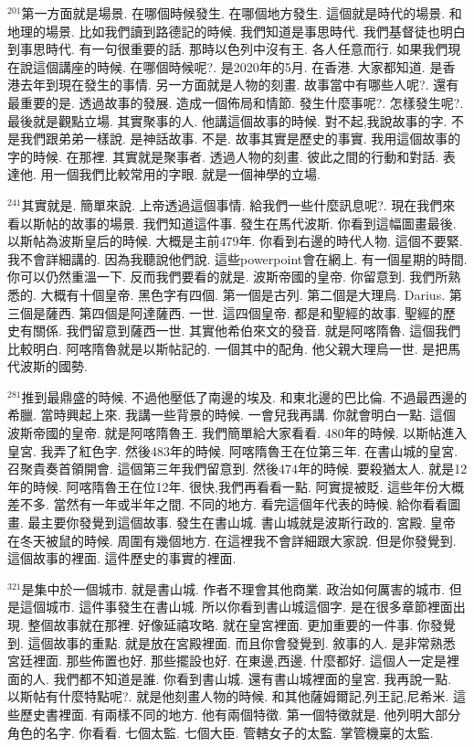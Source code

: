\documentclass{book}
\begin{document}
$^{201}$第一方面就是場景.
在哪個時候發生.
在哪個地方發生.
這個就是時代的場景.
和地理的場景.
比如我們讀到路德記的時候.
我們知道是事思時代.
我們基督徒也明白到事思時代.
有一句很重要的話.
那時以色列中沒有王.
各人任意而行.
如果我們現在說這個講座的時候.
在哪個時候呢?.
是2020年的5月.
在香港.
大家都知道.
是香港去年到現在發生的事情.
另一方面就是人物的刻畫.
故事當中有哪些人呢?.
還有最重要的是.
透過故事的發展.
造成一個佈局和情節.
發生什麼事呢?.
怎樣發生呢?.
最後就是觀點立場.
其實聚事的人.
他講這個故事的時候.
對不起,我說故事的字.
不是我們跟弟弟一樣說.
是神話故事.
不是.
故事其實是歷史的事實.
我用這個故事的字的時候.
在那裡.
其實就是聚事者.
透過人物的刻畫.
彼此之間的行動和對話.
表達他.
用一個我們比較常用的字眼.
就是一個神學的立場.

$^{241}$其實就是.
簡單來說.
上帝透過這個事情.
給我們一些什麼訊息呢?.
現在我們來看以斯帖的故事的場景.
我們知道這件事.
發生在馬代波斯.
你看到這幅圖畫最後.
以斯帖為波斯皇后的時候.
大概是主前479年.
你看到右邊的時代人物.
這個不要緊.
我不會詳細講的.
因為我聽說他們說.
這些powerpoint會在網上.
有一個星期的時間.
你可以仍然重溫一下.
反而我們要看的就是.
波斯帝國的皇帝.
你留意到.
我們所熟悉的.
大概有十個皇帝.
黑色字有四個.
第一個是古列.
第二個是大理烏.
Darius.
第三個是薩西.
第四個是阿達薩西.
一世.
這四個皇帝.
都是和聖經的故事.
聖經的歷史有關係.
我們留意到薩西一世.
其實他希伯來文的發音.
就是阿喀隋魯.
這個我們比較明白.
阿喀隋魯就是以斯帖記的.
一個其中的配角.
他父親大理烏一世.
是把馬代波斯的國勢.

$^{281}$推到最鼎盛的時候.
不過他壓低了南邊的埃及.
和東北邊的巴比倫.
不過最西邊的希臘.
當時興起上來.
我講一些背景的時候.
一會兒我再講.
你就會明白一點.
這個波斯帝國的皇帝.
就是阿喀隋魯王.
我們簡單給大家看看.
480年的時候.
以斯帖進入皇宮.
我弄了紅色字.
然後483年的時候.
阿喀隋魯王在位第三年.
在書山城的皇宮.
召聚貴奏首領開會.
這個第三年我們留意到.
然後474年的時候.
要殺猶太人.
就是12年的時候.
阿喀隋魯王在位12年.
很快,我們再看看一點.
阿實提被貶.
這些年份大概差不多.
當然有一年或半年之間.
不同的地方.
看完這個年代表的時候.
給你看看圖畫.
最主要你發覺到這個故事.
發生在書山城.
書山城就是波斯行政的.
宮殿.
皇帝在冬天被鼠的時候.
周圍有幾個地方.
在這裡我不會詳細跟大家說.
但是你發覺到.
這個故事的裡面.
這件歷史的事實的裡面.

$^{321}$是集中於一個城市.
就是書山城.
作者不理會其他商業.
政治如何厲害的城市.
但是這個城市.
這件事發生在書山城.
所以你看到書山城這個字.
是在很多章節裡面出現.
整個故事就在那裡.
好像延禧攻略.
就在皇宮裡面.
更加重要的一件事.
你發覺到.
這個故事的重點.
就是放在宮殿裡面.
而且你會發覺到.
敘事的人.
是非常熟悉宮廷裡面.
那些佈置也好.
那些擺設也好.
在東邊,西邊.
什麼都好.
這個人一定是裡面的人.
我們都不知道是誰.
你看到書山城.
還有書山城裡面的皇宮.
我再說一點.
以斯帖有什麼特點呢?.
就是他刻畫人物的時候.
和其他薩姆爾記,列王記,尼希米.
這些歷史書裡面.
有兩樣不同的地方.
他有兩個特徵.
第一個特徵就是.
他列明大部分角色的名字.
你看看.
七個太監.
七個大臣.
管轄女子的太監.
掌管機稟的太監.
\end{document}
